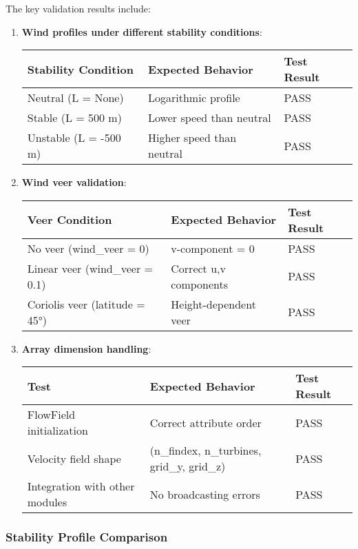 \documentclass{article}
\begin{document}
The key validation results include:

\begin{enumerate}[label=\arabic*.]
\item
  \textbf{Wind profiles under different stability conditions}:

  \begin{longtable}[]{@{}lll@{}}
  \toprule\noalign{}
  Stability Condition & Expected Behavior & Test Result \\
  \midrule\noalign{}
  \endhead
  \bottomrule\noalign{}
  \endlastfoot
  Neutral (L = None) & Logarithmic profile & PASS \\
  Stable (L = 500 m) & Lower speed than neutral & PASS \\
  Unstable (L = -500 m) & Higher speed than neutral & PASS \\
  \end{longtable}
\item
  \textbf{Wind veer validation}:

  \begin{longtable}[]{@{}lll@{}}
  \toprule\noalign{}
  Veer Condition & Expected Behavior & Test Result \\
  \midrule\noalign{}
  \endhead
  \bottomrule\noalign{}
  \endlastfoot
  No veer (wind\_veer = 0) & v-component = 0 & PASS \\
  Linear veer (wind\_veer = 0.1) & Correct u,v components & PASS \\
  Coriolis veer (latitude = 45°) & Height-dependent veer & PASS \\
  \end{longtable}
\item
  \textbf{Array dimension handling}:

  \begin{longtable}[]{@{}lll@{}}
  \toprule\noalign{}
  Test & Expected Behavior & Test Result \\
  \midrule\noalign{}
  \endhead
  \bottomrule\noalign{}
  \endlastfoot
  FlowField initialization & Correct attribute order & PASS \\
  Velocity field shape & (n\_findex, n\_turbines, grid\_y, grid\_z) &
  PASS \\
  Integration with other modules & No broadcasting errors & PASS \\
  \end{longtable}
\end{enumerate}

\hypertarget{stability-profile-comparison}{%
\subsubsection{Stability Profile
Comparison}\label{stability-profile-comparison}}
\end{document}
